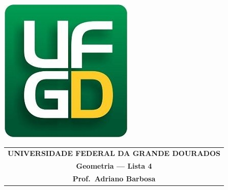 \documentclass[a4paper,5pt]{amsbook}
\begin{document}
\thispagestyle{empty}
\pagestyle{empty}
\begin{minipage}[h]{0.14\textwidth}
	\includegraphics[scale=0.24]{../../ufgd.png}
\end{minipage}
\begin{minipage}[h]{\textwidth}
\begin{tabular}{c}
{{\bf UNIVERSIDADE FEDERAL DA GRANDE DOURADOS}}\\
{{\bf Geometria --- Lista 4}}\\
{{\bf Prof.\ Adriano Barbosa}}\\
\end{tabular}
\vspace{-0.45cm}
%
\end{minipage}

\end{document}
